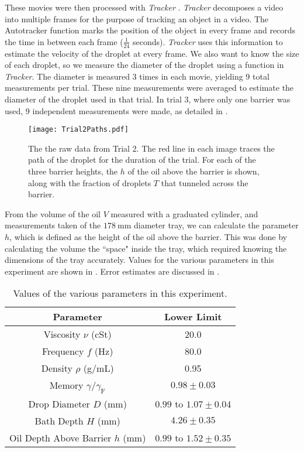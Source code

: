 These movies were then processed with \textit{Tracker} \cite{tracker}. \textit{Tracker} decomposes a video into multiple frames for the purpose of tracking an object in a video. The Autotracker function marks the position of the object in every frame and records the time in between each frame ($\frac{1}{24}$ seconds). \textit{Tracker} uses this information to estimate the velocity of the droplet at every frame. We also want to know the size of each droplet, so we measure the diameter of the droplet using a function in \textit{Tracker}. The diameter is measured 3 times in each movie, yielding 9 total measurements per trial. These nine measurements were averaged to estimate the diameter of the droplet used in that trial. In trial 3, where only one barrier was used, 9 independent measurements were made, as detailed in .

\begin{figure}[h!]
	\centering
	\texttt{[image: Trial2Paths.pdf]}
	\caption{The the raw data from Trial 2. The red line in each image traces the path of the droplet for the duration of the trial. For each of the three barrier heights, the $h$ of the oil above the barrier is shown, along with the fraction of droplets $T$ that tunneled across the barrier. }
	\label{trialex}
\end{figure}

From the volume of the oil $V$ measured with a graduated cylinder, and measurements taken of the $178~\mathrm{mm}$ diameter tray, we can calculate the parameter $h$, which is defined as the height of the oil above the barrier. This was done by calculating the volume the ``space" inside the tray, which required knowing the dimensions of the tray accurately. Values for the various parameters in this experiment are shown in . Error estimates are discussed in .%



	       \begin{table}[htdp] 
\caption[Basic Table 1]{Values of the various parameters in this experiment.} 
\begin{center} 
\begin{tabular}{c c} 
\toprule 
  Parameter &  Lower Limit\\
  \midrule
Viscosity $\nu$ (cSt) & 20.0 \\ 
Frequency $f$ (Hz) & 80.0 \\
Density $\rho$ (g/mL) & 0.95\\
Memory $\gamma/\gamma_\mathrm{F}$ & $0.98 \pm 0.03 $ \\
Drop Diameter $D$ (mm) & $0.99$ to $1.07 \pm 0.04$ \\
Bath Depth $H$ (mm) & $4.26 \pm 0.35$ \\
Oil Depth Above Barrier $h$ (mm) & $0.99$ to $1.52 \pm 0.35$ \\ 
\bottomrule 
\end{tabular}
\end{center}
\label{explimits} 
\end{table}	


